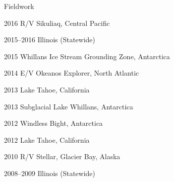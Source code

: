 \begin{cvlist}{Fieldwork} 

\item[2016] R/V Sikuliaq, Central Pacific
\item[2015--2016] Illinois (Statewide)
\item[2015] Whillans Ice Stream Grounding Zone, Antarctica
\item[2014] E/V Okeanos Explorer, North Atlantic
\item[2013] Lake Tahoe, California 
\item[2013] Subglacial Lake Whillans, Antarctica 
\item[2012] Windless Bight, Antarctica 
\item[2012] Lake Tahoe, California
\item[2010] R/V Stellar, Glacier Bay, Alaska
\item[2008--2009] Illinois (Statewide)

\end{cvlist}
